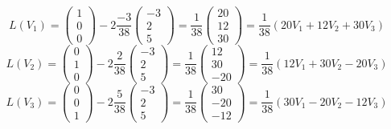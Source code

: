 \documentclass[12pt]{article}
\begin{document}
\begin{sloppypar}
    \[
        L(V_1) = \begin{pmatrix} 1 \\ 0 \\ 0 \end{pmatrix} - 2\dfrac{-3}{38}\begin{pmatrix} -3 \\ 2 \\ 5 \end{pmatrix}
        = \dfrac{1}{38}\begin{pmatrix} 20 \\ 12 \\ 30 \end{pmatrix}
        = \dfrac{1}{38}(20V_1 + 12V_2 + 30V_3)
    \]
    \[
        L(V_2) = \begin{pmatrix} 0 \\ 1 \\ 0 \end{pmatrix} - 2\dfrac{2}{38}\begin{pmatrix} -3 \\ 2 \\ 5 \end{pmatrix}
        = \dfrac{1}{38}\begin{pmatrix} 12 \\ 30 \\ -20 \end{pmatrix}
        = \dfrac{1}{38}(12V_1 + 30V_2 - 20V_3)
    \]
    \[
        L(V_3) = \begin{pmatrix} 0 \\ 0 \\ 1 \end{pmatrix} - 2\dfrac{5}{38}\begin{pmatrix} -3 \\ 2 \\ 5 \end{pmatrix}
        = \dfrac{1}{38}\begin{pmatrix} 30 \\ -20 \\ -12 \end{pmatrix}
        = \dfrac{1}{38}(30V_1 - 20V_2 - 12V_3)
    \]



\end{sloppypar}
\end{document}
